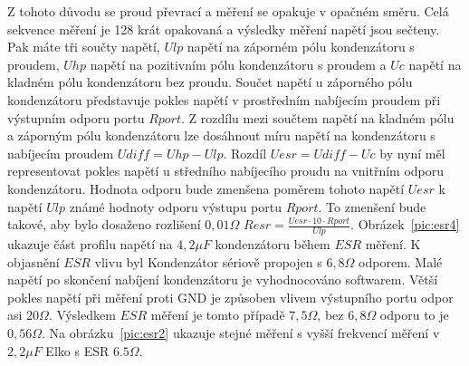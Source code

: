 Z tohoto důvodu se proud převrací a měření se opakuje v opačném směru.
Celá sekvence měření je  128 krát opakovaná a výsledky měření napětí jsou sečteny.
Pak máte tři součty napětí, \(Ulp\) napětí na záporném pólu kondenzátoru s proudem, \(Uhp\) napětí na
pozitivním pólu kondenzátoru s proudem a \(Uc\) napětí na kladném pólu kondenzátoru bez proudu.
Součet napětí u záporného pólu kondenzátoru představuje pokles napětí v prostředním nabíjecím proudem při výstupním odporu portu \(Rport\).
Z rozdílu mezi součtem napětí na kladném pólu a záporným pólu kondenzátoru
lze dosáhnout míru napětí na kondenzátoru s nabíjecím proudem \(Udiff = Uhp - Ulp\).
Rozdíl \(Uesr = Udiff - Uc\) by nyní měl representovat pokles napětí u středního nabíjecího proudu na vnitřním odporu kondenzátoru.
Hodnota odporu bude zmenšena poměrem tohoto napětí \(Uesr\) k napětí \(Ulp\) známé hodnoty odporu výstupu
portu \(Rport\).
To zmenšení bude takové, aby bylo dosaženo rozlišení \(0,01 \Omega\) 
 \(Resr = \frac{Uesr \cdot 10 \cdot Rport}{Ulp}\).
Obrázek~\ref{pic:esr4} ukazuje část profilu napětí na \(4,2\mu F\) kondenzátoru během \(ESR\) měření.
K objasnění \(ESR\) vlivu byl Kondenzátor sériově propojen s \(6,8 \Omega\) odporem. 
Malé napětí po skončení nabíjení kondenzátoru je vyhodnocováno softwarem.
Větší pokles napětí při měření proti GND je způsoben vlivem výstupního portu odpor asi \(20\Omega\).
Výsledkem \(ESR\) měření je tomto případě \(7,5 \Omega\), bez \(6,8 \Omega\) odporu to je \(0,56\Omega\).
Na obrázku~\ref{pic:esr2} ukazuje stejné měření s vyšší frekvencí měření v \(2,2\mu F\)
Elko s ESR \(6.5\Omega\).


